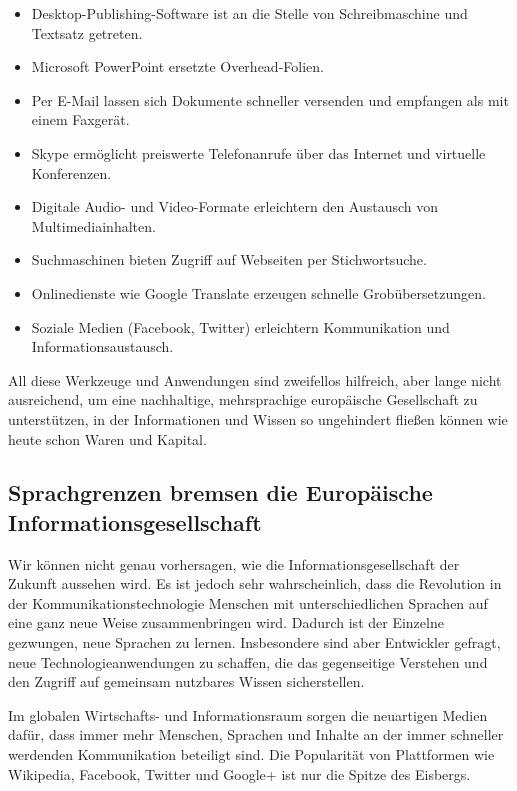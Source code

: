 \begin{multicols}{2}
\begin{itemize}
\item Desktop-Publishing-Software ist an die Stelle von Schreibmaschine und Textsatz getreten.
\item Microsoft PowerPoint ersetzte Overhead-Folien.
\item Per E-Mail lassen sich Dokumente schneller versenden und empfangen als mit einem Faxgerät.
\item Skype ermöglicht preiswerte Telefonanrufe über das Internet und virtuelle Konferenzen.
\item Digitale Audio- und Video-Formate erleichtern den Austausch von Multimediainhalten.
\item Suchmaschinen bieten Zugriff auf Webseiten per Stichwortsuche.
\item Onlinedienste wie Google Translate erzeugen schnelle Grobübersetzungen.
\item Soziale Medien (Facebook, Twitter) erleichtern Kommunika\-tion und  Informationsaustausch.
\end{itemize}

All diese Werkzeuge und Anwendungen sind zweifellos hilfreich, aber lange nicht ausreichend, um eine nachhaltige, mehrsprachige europäische Gesellschaft zu unterstützen, in der 
Informationen und Wissen so ungehindert fließen können wie heute schon Waren und Kapital. 

\subsection{Sprachgrenzen bremsen die Europäische Informations\-ge\-sell\-schaft}
  
Wir können nicht genau vorhersagen, wie die Informationsgesellschaft der Zukunft aussehen wird. Es ist jedoch sehr wahrscheinlich, dass die Revolution in der Kommunikationstechnologie Menschen mit unterschiedlichen Sprachen auf eine ganz neue Weise zusammenbringen wird. Dadurch ist der Einzelne gezwungen, neue Sprachen zu lernen. Insbesondere sind aber Entwickler gefragt, neue Technologieanwendungen zu schaffen, die das gegenseitige Verstehen und den Zugriff auf gemeinsam nutzbares Wissen sicherstellen.


Im globalen Wirtschafts- und Informationsraum sorgen die neuartigen Medien dafür, dass immer mehr Menschen, Sprachen und Inhalte an der immer schneller werdenden Kommunikation beteiligt sind.  
Die Popularität von Plattformen wie Wikipedia, Facebook, Twitter und Google+ ist nur die Spitze des Eisbergs.


\end{multicols}
